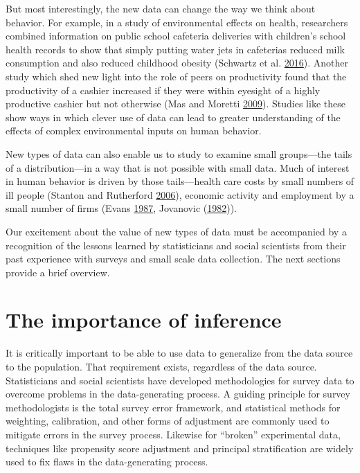 \documentclass[]{krantz}
\begin{document}
But most interestingly, the new data can change the way we think about
behavior. For example, in a study of environmental effects on health,
researchers combined information on public school cafeteria deliveries
with children's school health records to show that simply putting water
jets in cafeterias reduced milk consumption and also reduced childhood
obesity (Schwartz et al.
\protect\hyperlink{ref-schwartz2016effect}{2016}). Another study which
shed new light into the role of peers on productivity found that the
productivity of a cashier increased if they were within eyesight of a
highly productive cashier but not otherwise (Mas and Moretti
\protect\hyperlink{ref-mas2009peers}{2009}). Studies like these show
ways in which clever use of data can lead to greater understanding of
the effects of complex environmental inputs on human behavior.

New types of data can also enable us to study to examine small
groups---the tails of a distribution---in a way that is not possible
with small data. Much of interest in human behavior is driven by those
tails---health care costs by small numbers of ill people (Stanton and
Rutherford \protect\hyperlink{ref-stanton2006high}{2006}), economic
activity and employment by a small number of firms (Evans
\protect\hyperlink{ref-evans1987tests}{1987}, Jovanovic
(\protect\hyperlink{ref-jovanovic1982selection}{1982})).

Our excitement about the value of new types of data must be accompanied
by a recognition of the lessons learned by statisticians and social
scientists from their past experience with surveys and small scale data
collection. The next sections provide a brief overview.

\section{The importance of inference}\label{sec:1.3}

It is critically important to be able to use data to generalize from the
data source to the population. That requirement exists, regardless of
the data source. Statisticians and social scientists have developed
methodologies for survey data to overcome problems in the
data-generating process. A guiding principle for survey methodologists
is the total survey error framework, and statistical methods for
weighting, calibration, and other forms of adjustment are commonly used
to mitigate errors in the survey process. Likewise for ``broken''
experimental data, techniques like propensity score adjustment and
principal stratification are widely used to fix flaws in the
data-generating process.
\end{document}
